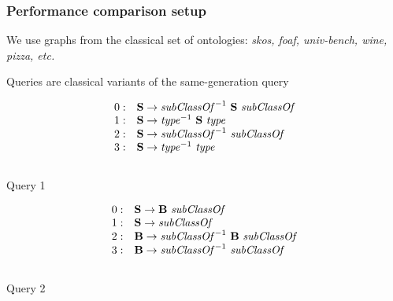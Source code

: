 \documentclass[xcolor=table,aspectratio=169]{beamer}
\begin{document}
\begin{frame}[fragile]
\transwipe[direction=90]
\frametitle{Performance comparison setup}
We use graphs from the classical set of ontologies: \textit{skos, foaf, univ-bench, wine, pizza, etc.}
\\
\vspace{2cm}

Queries are classical variants of the same-generation query

\begin{minipage}{0.47\textwidth}
\begin{center}
   \[
\begin{array}{rl}
   0: & \textbf{S} \rightarrow \text{\textit{subClassOf}}^{-1} \ \textbf{S} \ \text{\textit{subClassOf}} \\ 
   1: & \textbf{S} \rightarrow \text{\textit{type}}^{-1} \ \textbf{S} \ \text{\textit{type}} \\ 
   2: & \textbf{S} \rightarrow \text{\textit{subClassOf}}^{-1} \ \text{\textit{subClassOf}} \\ 
   3: & \textbf{S} \rightarrow \text{\textit{type}}^{-1} \ \text{\textit{type}} \\ 
\end{array}
\]
\\
   Query 1
   \end{center}
\end{minipage}
\vspace{2cm}
\begin{minipage} {0.47\textwidth}
   \begin{center}
   \[
\begin{array}{rl}
   0: & \textbf{S} \rightarrow \textbf{B} \ \text{\textit{subClassOf}} \\ 
   1: & \textbf{S} \rightarrow \text{\textit{subClassOf}} \\ 
   2: & \textbf{B} \rightarrow \text{\textit{subClassOf}}^{-1} \ \textbf{B} \ \text{\textit{subClassOf}} \\
   3: & \textbf{B} \rightarrow \text{\textit{subClassOf}}^{-1} \ \text{\textit{subClassOf}} \\ 
\end{array}
\]
\\
   Query 2
\end{center}
\end{minipage}


\end{frame}
\end{document}
